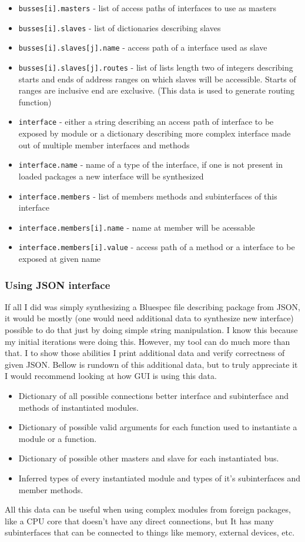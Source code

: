 \documentclass[12pt]{report}
\begin{document}
\begin{itemize}
    \item \verb!busses[i].masters! - list of access paths of interfaces to use as masters
    \item \verb!busses[i].slaves! - list of dictionaries describing slaves
    \item \verb!busses[i].slaves[j].name! - access path of a interface used as slave
    \item \verb!busses[i].slaves[j].routes! - list of lists length two of integers describing starts and ends of address ranges on which slaves will be accessible. Starts of ranges are inclusive end are exclusive. (This data is used to generate routing function)
    \item \verb!interface! - either a string describing an access path of interface to be exposed by module or a dictionary describing more complex interface made out of multiple member interfaces and methods
    \item \verb!interface.name! - name of a type of the interface, if one is not present in loaded packages a new interface will be synthesized
    \item \verb!interface.members! - list of members methods and subinterfaces of this interface
    \item \verb!interface.members[i].name! - name at member will be acessable
    \item \verb!interface.members[i].value! - access path of a method or a interface to be exposed at given name  
\end{itemize}


\subsubsection{Using JSON interface} 
If all I did was simply synthesizing a Bluespec file describing package from JSON, it would be mostly (one would need additional data to synthesize new interface) possible to do that just by doing simple string manipulation.
I know this because my initial iterations were doing this. However, my tool can do much more than that. I to show those abilities I print additional data and verify correctness of given JSON. Bellow is rundown of this additional data, but to truly appreciate it I would recommend looking at how GUI is using this data.
\begin{itemize}
    \item Dictionary of all possible connections better interface and subinterface and methods of instantiated modules.
    \item Dictionary of possible valid arguments for each function used to instantiate a module or a function.
    \item Dictionary of possible other masters and slave for each instantiated bus.
    \item Inferred types of every instantiated module and types of it's subinterfaces and member methods.
\end{itemize}
All this data can be useful when using complex modules from foreign packages, like a CPU core that doesn't have any direct connections, but It has many subinterfaces that can be connected to things like memory, external devices, etc.
\end{document}
